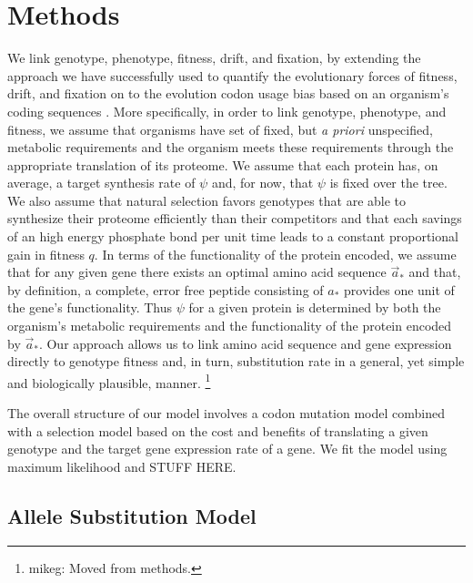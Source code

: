 \documentclass{article}
\newcommand{\aopt}{\ensuremath{a_*}\xspace}
\newcommand{\aoptvec}{\ensuremath{\Vec{a}_*}\xspace}
\begin{document}
\section*{Methods}\label{sec:methods}
We link genotype, phenotype, fitness, drift, and fixation, by extending the approach we have successfully used to quantify the evolutionary forces of fitness, drift, and fixation on to the evolution codon usage bias based on an organism's coding sequences \citep{GilchristAndWagner2006,Gilchrist2007,ShahAndGilchrist2011,GilchristEtAl2015}.
More specifically, in order to link genotype, phenotype, and fitness, we assume that organisms have set of fixed, but \emph{a priori} unspecified, metabolic requirements and the organism meets these requirements through the appropriate translation of its proteome.
We assume that each protein has, on average, a target synthesis rate of $\psi$ and, for now, that $\psi$ is fixed over the tree.
We also assume that natural selection favors genotypes that are able to synthesize their proteome efficiently than their competitors and that each savings of an high energy phosphate bond per unit time leads to a constant proportional gain in fitness $q$.
In terms of the functionality of the protein encoded, we assume that for any given gene there exists an optimal amino acid sequence \aoptvec and that, by definition, a complete, error free peptide consisting of \aopt provides one unit of the gene's functionality.
Thus $\psi$ for a given protein is determined by both the organism's metabolic requirements and the functionality of the protein encoded by \aoptvec.
Our approach allows us to link amino acid sequence and gene expression directly to genotype fitness and, in turn, substitution rate in a general, yet simple and biologically plausible, manner.
\footnote{mikeg: Moved from methods.}

The overall structure of our model involves a codon mutation model combined with a selection model based on the cost and benefits of translating a given genotype and the target gene expression rate of a gene.
We fit the model using maximum likelihood and STUFF HERE.

\subsection*{Allele Substitution Model}
\end{document}
